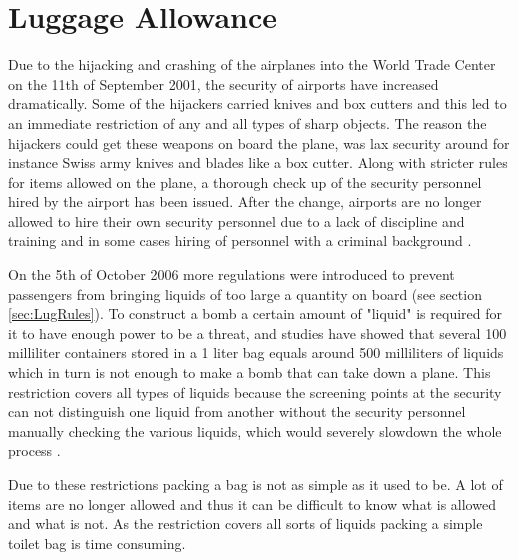 \section{Luggage Allowance}

Due to the hijacking and crashing of the airplanes into the World Trade Center on the 11th of September 2001, the security of airports have increased dramatically. Some of the hijackers carried knives and box cutters and this led to an immediate restriction of any and all types of sharp objects. The reason the hijackers could get these weapons on board the plane, was lax security around for instance Swiss army knives and blades like a box cutter. Along with stricter rules for items allowed on the plane, a thorough check up of the security personnel hired by the airport has been issued. After the change, airports are no longer allowed to hire their own security personnel due to a lack of discipline and training and in some cases hiring of personnel with a criminal background \citep{Stricter_rules}.


On the 5th of October 2006 more regulations were introduced to prevent passengers from bringing liquids of too large a quantity on board (see section \ref{sec:LugRules}). To construct a bomb a certain amount of "liquid" is required for it to have enough power to be a threat, and studies have showed that several 100 milliliter containers stored in a 1 liter bag equals around 500 milliliters of liquids which in turn is not enough to make a bomb that can take down a plane. This restriction covers all types of liquids because the screening points at the security can not distinguish one liquid from another without the security personnel manually checking the various liquids, which would severely slowdown the whole process \citep{Why_rules}.


Due to these restrictions packing a bag is not as simple as it used to be. A lot of items are no longer allowed and thus it can be difficult to know what is allowed and what is not. As the restriction covers all sorts of liquids packing a simple toilet bag is time consuming.
